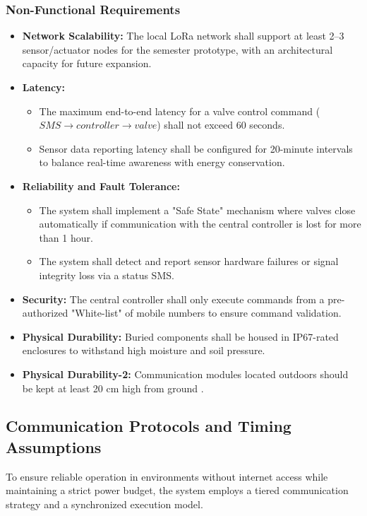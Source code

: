 \documentclass[conference]{IEEEtran}
\begin{document}
\subsubsection{Non-Functional Requirements}
\begin{itemize}
    \item \textbf{Network Scalability:} The local LoRa network shall support at least 2--3 sensor/actuator nodes for the semester prototype, with an architectural capacity for future expansion.
    \item \textbf{Latency:}
    \begin{itemize}
        \item The maximum end-to-end latency for a valve control command ($SMS \rightarrow controller \rightarrow valve$) shall not exceed 60 seconds.
        \item Sensor data reporting latency shall be configured for 20-minute intervals to balance real-time awareness with energy conservation.
    \end{itemize}
    \item \textbf{Reliability and Fault Tolerance:}
    \begin{itemize}
        \item The system shall implement a "Safe State" mechanism where valves close automatically if communication with the central controller is lost for more than 1 hour.
        \item The system shall detect and report sensor hardware failures or signal integrity loss via a status SMS.
    \end{itemize}
    \item \textbf{Security:} The central controller shall only execute commands from a pre-authorized "White-list" of mobile numbers to ensure command validation.
    \item \textbf{Physical Durability:} Buried components shall be housed in IP67-rated enclosures to withstand high moisture and soil pressure\cite{balivada2022wireless}.
    \item \textbf{Physical Durability-2:} Communication modules located outdoors should be kept at least 20 cm high from ground \cite{yu2012research}.
\end{itemize}
\subsection{Communication Protocols and Timing Assumptions}

To ensure reliable operation in environments without internet access while maintaining a strict power budget, the system employs a tiered communication strategy and a synchronized execution model.
\end{document}
